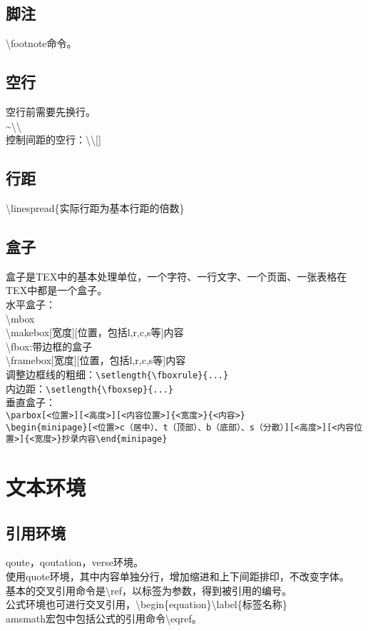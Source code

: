 \documentclass{book}%
\begin{document}
    \section{脚注}
    \textbackslash footnote命令。
    
    \section{空行}
    空行前需要先换行。\\
    \~ \thinspace \textbackslash \textbackslash\\
    控制间距的空行：\textbackslash \textbackslash []
    
    \section{行距}
    \textbackslash linespread\{实际行距为基本行距的倍数\}  
        
    \section{盒子}
    盒子是TEX中的基本处理单位，一个字符、一行文字、一个页面、一张表格在TEX中都是一个盒子。\\
    水平盒子：\\
    \textbackslash mbox\\
    \textbackslash makebox[宽度][位置，包括l,r,c,s等]{内容}\\
    \textbackslash fbox:带边框的盒子\\
    \textbackslash framebox[宽度][位置，包括l,r,c,s等]{内容}\\
    调整边框线的粗细：\verb|\setlength{\fboxrule}{...}|\\  
    内边距：\verb|\setlength{\fboxsep}{...}|\\
    垂直盒子：\\
    \verb|\parbox[<位置>][<高度>][<内容位置>]{<宽度>}{<内容>}|\\
    \verb|\begin{minipage}[<位置>c（居中）、t（顶部）、b（底部）、s（分散）][<高度>][<内容位置>]{<宽度>}抄录内容\end{minipage}|\\
        
    \chapter{文本环境}
    
    \section{引用环境}
    qoute，qoutation，verse环境。\\
    使用quote环境，其中内容单独分行，增加缩进和上下间距排印，不改变字体。\\
    基本的交叉引用命令是\textbackslash ref，以标签为参数，得到被引用的编号。\\
    公式环境也可进行交叉引用，\textbackslash begin\{equation\}\textbackslash label\{标签名称\}\\
    amsmath宏包中包括公式的引用命令\textbackslash eqref。
    
\end{document}
